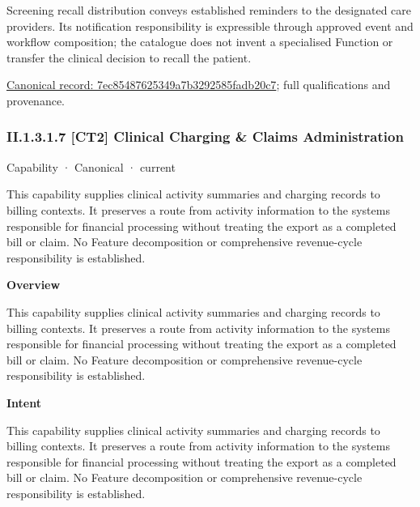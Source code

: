 Screening recall distribution conveys established reminders to the designated care providers. Its notification responsibility is expressible through approved event and workflow composition; the catalogue does not invent a specialised Function or transfer the clinical decision to recall the patient.


{\footnotesize \href{../../../../continuum/strategy/capability/feature/7ec85487625349a7b3292585fadb20c7.md}{Canonical record: 7ec85487625349a7b3292585fadb20c7}; full qualifications and provenance.}\par
\subsubsection*{II.1.3.1.7 [CT2] Clinical Charging \& Claims Administration}
\label{navigation:II.1.3.1.7}

\label{element:af78ab7c89454a608cd4d34ec7703331}
{\small Capability · Canonical · current}\par

This capability supplies clinical activity summaries and charging records to billing contexts. It preserves a route from activity information to the systems responsible for financial processing without treating the export as a completed bill or claim. No Feature decomposition or comprehensive revenue-cycle responsibility is established.



\textbf{Overview}



This capability supplies clinical activity summaries and charging records to billing contexts. It preserves a route from activity information to the systems responsible for financial processing without treating the export as a completed bill or claim. No Feature decomposition or comprehensive revenue-cycle responsibility is established.



\textbf{Intent}



This capability supplies clinical activity summaries and charging records to billing contexts. It preserves a route from activity information to the systems responsible for financial processing without treating the export as a completed bill or claim. No Feature decomposition or comprehensive revenue-cycle responsibility is established.



